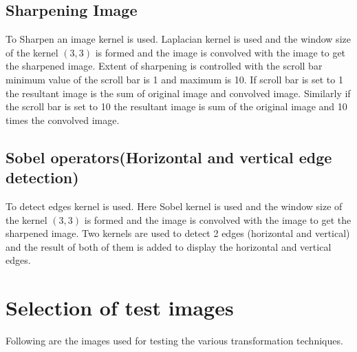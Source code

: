 \documentclass{article}
\begin{document}
\subsection{Sharpening Image}
To Sharpen an image kernel is used. Laplacian kernel is used and the window size of the kernel $(3,3)$ is formed and the image is convolved with the image to get the sharpened image. Extent of sharpening is controlled with the scroll bar minimum value of the scroll bar is 1 and maximum is 10. If scroll bar is set to 1 the resultant image is the sum of original image and convolved image. Similarly if the scroll bar is set to 10 the resultant image is sum of the original image and 10 times the convolved image.

\subsection{Sobel operators(Horizontal and vertical edge detection)}
To detect edges kernel is used. Here Sobel kernel is used and the window size of the kernel $(3,3)$ is formed and the image is convolved with the image to get the sharpened image. Two kernels are used to detect 2 edges (horizontal and vertical) and the result of both of them is added to display the horizontal and vertical edges.

\section{Selection of test images}
\label{sec:typestyle}

Following are the images used for testing the various transformation techniques.
\end{document}

